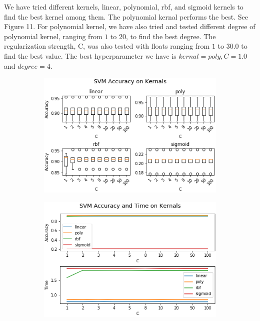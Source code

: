 \documentclass[11.5pt]{article}
\begin{document}
\begin{enumerate}
\begin{itemize}
\begin{enumerate}
                We have tried different kernels, linear, polynomial, rbf, and sigmoid kernels to find the best kernel among them. The polynomial kernal performs the best. See Figure 11.
                For polynomial kernel, we have also tried and tested different degree of polynomial kernel, ranging from $1$ to $20$, to find the best degree.
                The regularization strength, C, was also tested with floats ranging from $1$ to $30.0$ to find the best value. The best hyperparameter we have is $kernal = poly, C = 1.0$ and $degree = 4$.
                \begin{figure}[h!]
                    \begin{subfigure}[b]{0.5\linewidth}
                        \centering
                        \includegraphics[width=\linewidth]{images/res_tradi_SVM_penalty.png}
                    \end{subfigure}
                    \begin{subfigure}[b]{0.5\linewidth}
                        \centering
                        \includegraphics[width=\linewidth]{images/res_tradi_SVM_penalty2.png}

\end{subfigure}
\end{figure}
\end{enumerate}
\end{itemize}
\end{enumerate}
\end{document}
